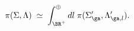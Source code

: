 \begin{equation}
\pi(\Sigma,\Lambda)\;\simeq\; \int_{\BR^+}^{\oplus}dl \;
\pi(\Sigma'_{\ga},\Lambda'_{\ga,l}).
\end{equation}


